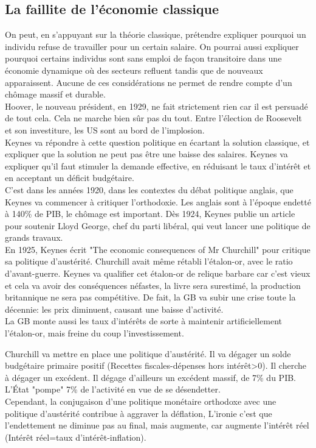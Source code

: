 \documentclass[10pt, a4paper, openany]{book}
\begin{document}
\subsection{La faillite de l'économie classique}

On peut, en s'appuyant sur la théorie classique, prétendre expliquer pourquoi un individu refuse de travailler pour un certain salaire. On pourrai aussi expliquer pourquoi certains individus sont sans emploi de façon transitoire dans une économie dynamique où des secteurs refluent tandis que de nouveaux apparaissent. Aucune de ces considérations ne permet de rendre compte d'un chômage massif et durable. \\
Hoover, le nouveau président, en 1929, ne fait strictement rien car il est persuadé de tout cela. Cela ne marche bien sûr pas du tout. Entre l'élection de Roosevelt et son investiture, les US sont au bord de l'implosion. \\
Keynes va répondre à cette question politique en écartant la solution classique, et expliquer que la solution ne peut pas être une baisse des salaires. Keynes va expliquer qu'il faut stimuler la demande effective, en réduisant le taux d'intérêt et en acceptant un déficit budgétaire. \\
C'est dans les années 1920, dans les contextes du débat politique anglais, que Keynes va commencer à critiquer l'orthodoxie. Les anglais sont à l'époque endetté à 140\% de PIB, le chômage est important. Dès 1924, Keynes publie un article pour soutenir Lloyd George, chef du parti libéral, qui veut lancer une politique de grands travaux. \\
En 1925, Keynes écrit "The economic consequences of Mr Churchill" pour critique sa politique d'austérité. Churchill avait même rétabli l'étalon-or, avec le ratio d'avant-guerre. Keynes va qualifier cet étalon-or de relique barbare car c'est vieux et cela va avoir des conséquences néfastes, la livre sera surestimé, la production britannique ne sera pas compétitive. De fait, la GB va subir une crise toute la décennie: les prix diminuent, causant une baisse d'activité. \\
La GB monte aussi les taux d'intérêts de sorte à maintenir artificiellement l'étalon-or, mais freine du coup l'investissement.


Churchill va mettre en place une politique d'austérité. Il va dégager un solde budgétaire primaire positif (Recettes fiscales-dépenses hors intérêt>0). Il cherche à dégager un excédent. Il dégage d'ailleurs un excédent massif, de 7\% du PIB. L'État "pompe" 7\% de l'activité en vue de se désendetter. \\
Cependant, la conjugaison d'une politique monétaire orthodoxe avec une politique d'austérité contribue à aggraver la déflation, L'ironie c'est que l'endettement ne diminue pas au final, mais augmente, car augmente l'intérêt réel (Intérêt réel=taux d'intérêt-inflation). 
\end{document}
